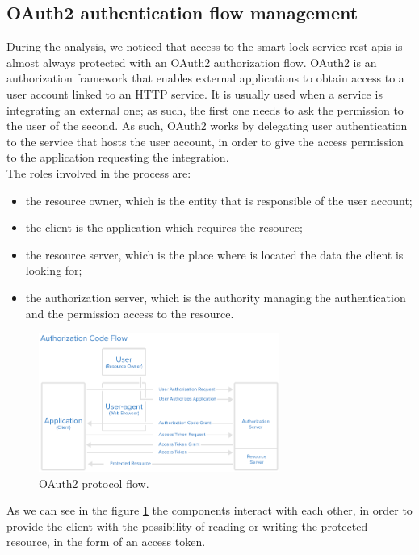 \subsection{OAuth2 authentication flow management}
\label{sec:oauth}
During the analysis, we noticed that access to the smart-lock service \acrshort{rest} \acrshort{api}s is almost always protected with an OAuth2 authorization flow. OAuth2 is an authorization framework that enables external applications to obtain access to a user account linked to an HTTP service. It is usually used when a service is integrating an external one; as such, the first one needs to ask the permission to the user of the second. As such, OAuth2 works by delegating user authentication to the service that hosts the user account, in order to give the access permission to the application requesting the integration.
\\ The roles involved in the process are:
\begin{itemize}
    \item the resource owner, which is the entity that is responsible of the user account;
    \item the client is the application which requires the resource;
    \item the resource server, which is the place where is located the data the client is looking for;
    \item the authorization server, which is the authority managing the authentication and the permission access to the resource.
\end{itemize}
\begin{figure}[ht]
    \centering
    \includegraphics[width=0.7\textwidth]{figures/auth_code_flow.png}
    \caption{OAuth2 protocol flow.}
    \label{fig:oauthflow}
\end{figure}
As we can see in the figure \ref{fig:oauthflow} the components interact with each other, in order to provide the client with the possibility of reading or writing the protected resource, in the form of an access token. \cite{anicas_2014}
